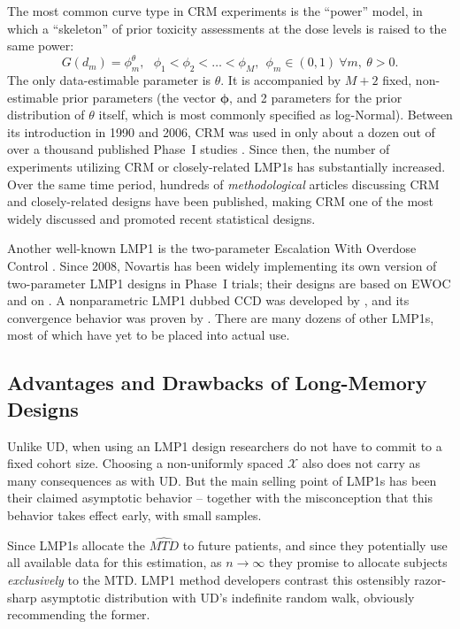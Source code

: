 The most common curve type in CRM experiments is the ``power'' model, in which a ``skeleton'' of prior toxicity assessments at the dose levels is raised to the same power:
\begin{equation}\label{eq:crm0}
G\left(d_m\right)=\phi_m^\theta,\ \ \ \phi_1<\phi_2<\ldots <\phi_M ,\ \ \phi_m\in(0,1) \ \forall m,\ \theta>0.
\end{equation}
The only data-estimable parameter is $\theta$. It is accompanied by $M+2$ fixed, non-estimable prior parameters (the vector $\boldsymbol{\phi}$, and 2 parameters for the prior distribution of $\theta$ itself, which is most commonly specified as log-Normal). Between its introduction in 1990 and 2006, CRM was used in only about a dozen out of over a thousand published Phase~I studies \citep{Rogat:etal:oped:2007}. Since then, the number of experiments utilizing CRM or closely-related LMP1s has substantially increased. Over the same time period, hundreds of \emph{methodological} articles discussing CRM and closely-related designs have been published, making CRM one of the most widely discussed and promoted recent statistical designs. 

Another well-known LMP1 is the two-parameter Escalation With Overdose Control \citep[EWOC,][]{Babb:Roga:Roga:Zack:canc:1998}. Since 2008, Novartis has been widely implementing its own version of two-parameter LMP1 designs in Phase~I trials; their designs are based on EWOC and on \cite{Neunsch08}. A nonparametric LMP1 dubbed CCD was developed by \cite{Ivan:Flou:Chun:Cumu:2007}, and its convergence behavior was proven by \cite{oron:azri:hoff:dose:2011}. There are many dozens of other LMP1s, most of which have yet to be placed into actual use.

\subsection{Advantages and Drawbacks of Long-Memory Designs}

Unlike UD, when using an LMP1 design researchers do not have to commit to a fixed cohort size. Choosing a non-uniformly spaced $\mathcal{X}$ also does not carry as many consequences as with UD. But the main selling point of LMP1s has been their claimed asymptotic behavior -- together with the misconception that this behavior takes effect early, with small samples.

Since LMP1s allocate the $\widehat{MTD}$ to future patients, and since they potentially use all available data for this estimation, as $n\to\infty$ they promise to allocate subjects \emph{exclusively} to the MTD. LMP1 method developers contrast this ostensibly razor-sharp asymptotic distribution with UD's indefinite random walk, obviously recommending the former.

